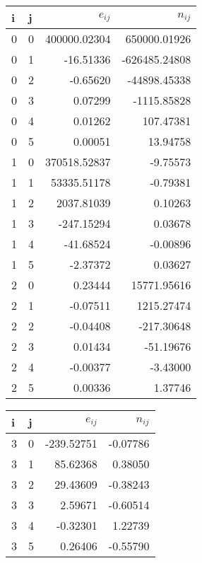 \documentclass[10pt,a4paper]{article}
\begin{document}
\begin{table}
  \centering
\begin{tabular}{l l r r}
\toprule
\textbf{i} & \textbf{j} & $e_{ij}$ & $n_{ij}$ \\
\midrule
0 & 0 &    400000.02304 &    650000.01926 \\
0 & 1 &       -16.51336 &   -626485.24808 \\
0 & 2 &        -0.65620 &    -44898.45338 \\
0 & 3 &         0.07299 &     -1115.85828 \\
0 & 4 &         0.01262 &       107.47381 \\
0 & 5 &         0.00051 &        13.94758 \\
1 & 0 &    370518.52837 &        -9.75573 \\
1 & 1 &     53335.51178 &        -0.79381 \\
1 & 2 &      2037.81039 &         0.10263 \\
1 & 3 &      -247.15294 &         0.03678 \\
1 & 4 &       -41.68524 &        -0.00896 \\
1 & 5 &        -2.37372 &         0.03627 \\
2 & 0 &         0.23444 &     15771.95616 \\
2 & 1 &        -0.07511 &      1215.27474 \\
2 & 2 &        -0.04408 &      -217.30648 \\
2 & 3 &         0.01434 &       -51.19676 \\
2 & 4 &        -0.00377 &        -3.43000 \\
2 & 5 &         0.00336 &         1.37746 \\
\bottomrule
\end{tabular}
\quad\quad
\begin{tabular}{l l r r}
\toprule
\textbf{i} & \textbf{j} & $e_{ij}$ & $n_{ij}$ \\
\midrule
3 & 0 &      -239.52751 &        -0.07786 \\
3 & 1 &        85.62368 &         0.38050 \\
3 & 2 &        29.43609 &        -0.38243 \\
3 & 3 &         2.59671 &        -0.60514 \\
3 & 4 &        -0.32301 &         1.22739 \\
3 & 5 &         0.26406 &        -0.55790 \\

\end{tabular}
\end{table}
\end{document}
